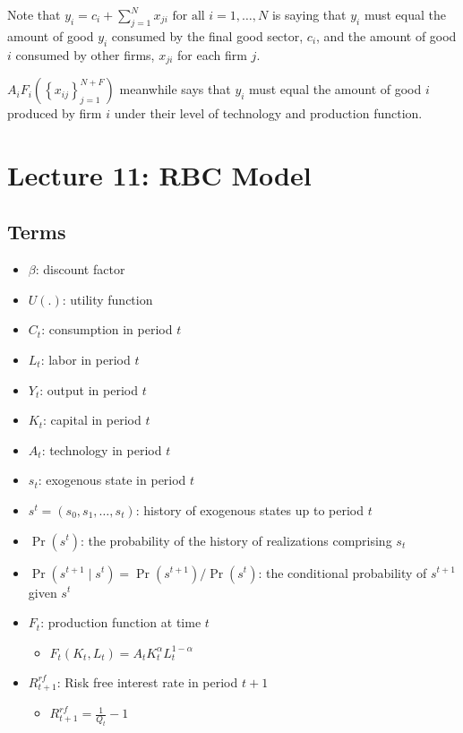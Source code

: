 \documentclass[10pt]{article}
\begin{document}
Note that $y_i=c_i+\sum_{j=1}^N x_{j i} \text { for all } i=1, \ldots, N$ 
is saying that $y_i$ must equal the amount of good $y_i$ consumed 
by the final good sector, $c_i$, and the 
amount of good $i$ consumed by other firms, $x_{j i}$ for each firm $j$.

$A_i F_i\left(\left\{x_{i j}\right\}_{j=1}^{N+F}\right)$ meanwhile 
says that $y_i$ must equal the amount of good $i$ produced by firm $i$
under their level of technology and production function.


\section{Lecture 11: RBC Model}

\subsection{Terms}

\begin{itemize}
    \item $\beta$: discount factor
    \item $U(.)$: utility function
    \item $C_t$: consumption in period $t$
    \item $L_t$: labor in period $t$
    \item $Y_t$: output in period $t$
    \item $K_t$: capital in period $t$
    \item $A_t$: technology in period $t$
    \item $s_t$: exogenous state in period $t$
    \item $s^t = (s_0, s_1, \ldots, s_t)$: history of exogenous states up to period $t$
    \item $\operatorname{Pr}\left(s^t\right)$: the probability of the history of realizations comprising $s_t$
    \item $\operatorname{Pr}\left(s^{t+1} \mid s^t\right)=\operatorname{Pr}\left(s^{t+1}\right) / \operatorname{Pr}\left(s^t\right)$: the conditional probability of $s^{t+1}$ given $s^t$
    \item $F_t$: production function at time $t$
        \begin{itemize}
            \item $F_t\left(K_t, L_t\right)=A_t K_t^\alpha L_t^{1-\alpha}$
        \end{itemize}
    \item $R_{t+1}^{r f}$: Risk free interest rate in period $t+1$
        \begin{itemize}
            \item $R_{t+1}^{r f} = \frac{1}{Q_t} - 1$
        \end{itemize}
\end{itemize}
\end{document}
